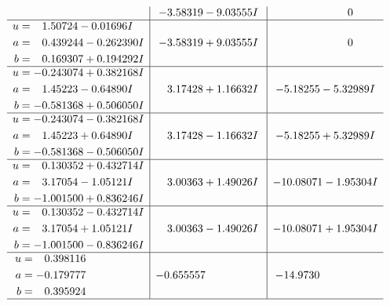 \documentclass[1p]{elsarticle_modified}
\theoremstyle{definition}
\begin{document}
$$\begin{array}{c|c|c}
 & -3.58319 - 9.03555 I & \phantom{-0.000000 } 0 \\ \hline\begin{aligned}
u &= \phantom{-}1.50724 - 0.01696 I \\
a &= \phantom{-}0.439244 - 0.262390 I \\
b &= \phantom{-}0.169307 + 0.194292 I\end{aligned}
 & -3.58319 + 9.03555 I & \phantom{-0.000000 } 0 \\ \hline\begin{aligned}
u &= -0.243074 + 0.382168 I \\
a &= \phantom{-}1.45223 - 0.64890 I \\
b &= -0.581368 + 0.506050 I\end{aligned}
 & \phantom{-}3.17428 + 1.16632 I & -5.18255 - 5.32989 I \\ \hline\begin{aligned}
u &= -0.243074 - 0.382168 I \\
a &= \phantom{-}1.45223 + 0.64890 I \\
b &= -0.581368 - 0.506050 I\end{aligned}
 & \phantom{-}3.17428 - 1.16632 I & -5.18255 + 5.32989 I \\ \hline\begin{aligned}
u &= \phantom{-}0.130352 + 0.432714 I \\
a &= \phantom{-}3.17054 - 1.05121 I \\
b &= -1.001500 + 0.836246 I\end{aligned}
 & \phantom{-}3.00363 + 1.49026 I & -10.08071 - 1.95304 I \\ \hline\begin{aligned}
u &= \phantom{-}0.130352 - 0.432714 I \\
a &= \phantom{-}3.17054 + 1.05121 I \\
b &= -1.001500 - 0.836246 I\end{aligned}
 & \phantom{-}3.00363 - 1.49026 I & -10.08071 + 1.95304 I \\ \hline\begin{aligned}
u &= \phantom{-}0.398116\phantom{ +0.000000I} \\
a &= -0.179777\phantom{ +0.000000I} \\
b &= \phantom{-}0.395924\phantom{ +0.000000I}\end{aligned}
 & -0.655557\phantom{ +0.000000I} & -14.9730\phantom{ +0.000000I}\\
 \hline 
 \end{array}$$\newpage$$\begin{array}{c|c|c}  

\end{array}$$
\end{document}
